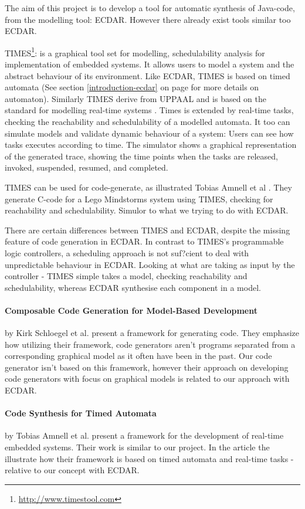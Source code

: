The aim of this project is to develop a tool for automatic synthesis of Java-code, from the modelling tool: ECDAR. However there already exist tools similar too ECDAR.

TIMES\footnote{\url{http://www.timestool.com}}: is a graphical tool set for modelling, schedulability analysis for implementation of embedded systems. It allows users to model a system and the abstract behaviour of its environment. 
Like ECDAR, TIMES is based on timed automata (See section \ref{introduction-ecdar} on page \pageref{introduction-ecdar} for more details on automaton). Similarly TIMES derive from UPPAAL and is based on the standard for modelling real-time systems \cite{Alur1994:183}.
Times is extended by real-time tasks, checking the reachability and schedulability of a modelled automata. It too can simulate models and validate dynamic behaviour of a system: Users can see how tasks executes according to time. The simulator shows a graphical representation of the generated trace, showing the time points when the tasks are released, invoked, suspended, resumed, and completed.

TIMES can be used for code-generate, as illustrated Tobias Amnell et al \cite{Amnell:2002:CST:779110.779112}. They generate C-code for a Lego Mindstorms system using TIMES, checking for reachability and schedulability. Simulor to what we trying to do with ECDAR. 

There are certain differences between TIMES and ECDAR, despite the missing feature of code generation in ECDAR. In contrast to TIMES's programmable logic controllers, a scheduling approach is not suf?cient to deal with unpredictable behaviour in ECDAR.
Looking at what are taking as input by the controller - TIMES simple takes a model, checking reachability and schedulability, whereas ECDAR synthesise each component in a model.



\paragraph{Composable Code Generation for Model-Based Development}
by Kirk Schloegel et al. present a framework for generating
code\cite{composable-code-generation}. They emphasize how utilizing their
framework, code generators aren't programs separated from a corresponding
graphical model as it often have been in the past. Our code generator isn't
based on this framework, however their approach on developing code generators
with focus on graphical models is related to our approach with ECDAR.

\paragraph{Code Synthesis for Timed Automata}
by Tobias Amnell et al. present a framework for the development of real-time
embedded systems\cite{Amnell:2002:CST:779110.779112}. Their work is similar to
our project. In the article the illustrate how their framework is based on timed
automata and real-time tasks - relative to our concept with ECDAR.

